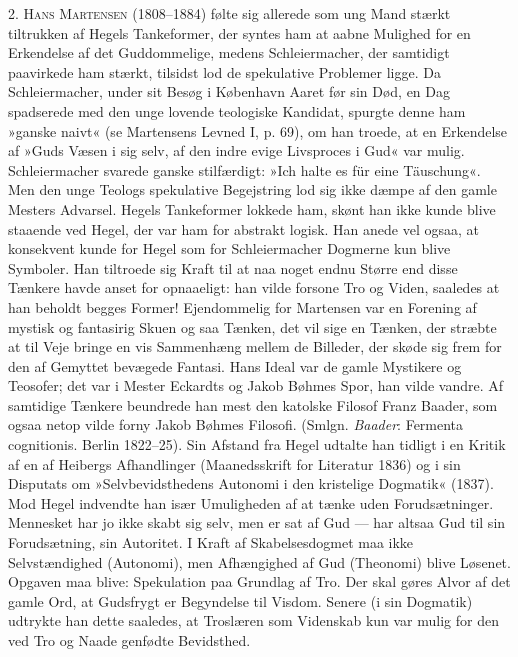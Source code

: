 \documentclass[12pt,a4paper,openany]{book}
\newcommand{\opage}[1]{\marginnote{\footnotesize\textit{[#1]}}}
\begin{document}
\opage{18}2. \textsc{Hans Martensen} (1808--1884) følte sig allerede
som ung Mand stærkt tiltrukken af Hegels Tankeformer,
der syntes ham at aabne Mulighed for en Erkendelse af
det Guddommelige, medens Schleiermacher, der samtidigt
paavirkede ham stærkt, tilsidst lod de spekulative Problemer
ligge. Da Schleiermacher, under sit Besøg i
København Aaret før sin Død, en Dag spadserede med
den unge lovende teologiske Kandidat, spurgte denne
ham »ganske naivt« (se Martensens Levned I, p. 69), om
han troede, at en Erkendelse af »Guds Væsen i sig selv,
af den indre evige Livsproces i Gud« var mulig. Schleiermacher
svarede ganske stilfærdigt: »Ich halte es für eine
Täuschung«. Men den unge Teologs spekulative Begejstring
lod sig ikke dæmpe af den gamle Mesters Advarsel.
Hegels Tankeformer lokkede ham, skønt han ikke kunde
blive staaende ved Hegel, der var ham for abstrakt
logisk. Han anede vel ogsaa, at konsekvent kunde for
Hegel som for Schleiermacher Dogmerne kun blive Symboler.
Han tiltroede sig Kraft til at naa noget endnu
Større end disse Tænkere havde anset for opnaaeligt:
han vilde forsone Tro og Viden, saaledes at han beholdt
begges Former! Ejendommelig for Martensen var en
Forening af mystisk og fantasirig Skuen og saa Tænken,
det vil sige en Tænken, der stræbte at til Veje bringe
en vis Sammenhæng mellem de Billeder, der skøde sig
frem for den af Gemyttet bevægede Fantasi. Hans
Ideal var de gamle Mystikere og Teosofer; det var i
Mester Eckardts og Jakob Bøhmes Spor, han vilde
vandre. Af samtidige Tænkere beundrede han mest den
katolske Filosof Franz Baader, som ogsaa netop vilde
forny Jakob Bøhmes Filosofi. (Smlgn. \textit{Baader}: Fermenta
cognitionis. Berlin 1822--25). Sin Afstand fra Hegel
udtalte han tidligt i en Kritik af en af Heibergs Afhandlinger
(Maanedsskrift for Literatur 1836) og i sin
\opage{19}Disputats om »Selvbevidsthedens Autonomi i den kristelige
Dogmatik« (1837). Mod Hegel indvendte han især
Umuligheden af at tænke uden Forudsætninger. Mennesket
har jo ikke skabt sig selv, men er sat af Gud ---
har altsaa Gud til sin Forudsætning, sin Autoritet. I
Kraft af Skabelsesdogmet maa ikke Selvstændighed
(Autonomi), men Afhængighed af Gud (Theonomi) blive
Løsenet. Opgaven maa blive: Spekulation paa Grundlag
af Tro. Der skal gøres Alvor af det gamle Ord, at Gudsfrygt
er Begyndelse til Visdom. Senere (i sin Dogmatik)
udtrykte han dette saaledes, at Troslæren som Videnskab
kun var mulig for den ved Tro og Naade genfødte Bevidsthed.
\end{document}
